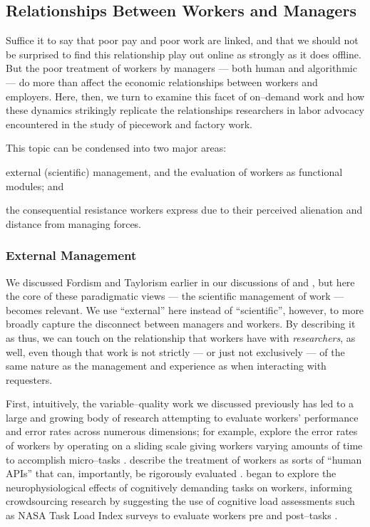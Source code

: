 \documentclass[trackingWork]{subfiles}
\begin{document}
{\subsection{Relationships Between Workers and Managers}\label{sec:relationships}
Suffice it to say that poor pay and poor work are linked,
and that we should not be surprised to find this relationship play out online as strongly as it does offline.
But the poor treatment of workers by managers
--- both human and algorithmic ---
do more than affect the economic relationships between workers and employers.
Here, then, we turn to examine this facet of on--demand work
and how these dynamics strikingly replicate the relationships
researchers in labor advocacy encountered in the study of piecework and factory work.

This topic can be condensed into two major areas:
\begin{inlinelist}
\item external (scientific) management, and the evaluation of workers as functional modules; and
\item the consequential resistance workers express due to their perceived alienation and distance from managing forces.
\end{inlinelist}

\subsubsection{External Management}
We discussed Fordism and Taylorism earlier in our discussions of
 and ,
but here the core of these paradigmatic views
--- the scientific management of work ---
becomes relevant.
We use ``external'' here instead of ``scientific'', however,
to more broadly capture the disconnect between managers and workers.
By describing it as thus,
we can touch on the relationship that workers have with \textit{researchers}, as well,
even though that work is not strictly
--- or just not exclusively ---
of the same nature as the management and experience as when interacting with requesters.

First, intuitively, the variable--quality work we discussed previously has led to
a large and growing body of research attempting to evaluate workers' performance and error rates
across numerous dimensions;
for example, \citeauthor{measuringCrowdsourcingCheng} explore the error rates of workers by
operating on a sliding scale giving workers varying amounts of time to accomplish micro--tasks
\cite{measuringCrowdsourcingCheng}.
\citeauthor{storiesIraniSilberman} describe the treatment of workers
as sorts of ``human APIs'' that can, importantly, be rigorously evaluated
\cite{storiesIraniSilberman}.
\citeauthor{gevins2003neurophysiological} began to explore the neurophysiological effects of
cognitively demanding tasks on workers,
informing crowdsourcing research by suggesting the use of cognitive load assessments such as
NASA Task Load Index surveys to evaluate workers pre and post--tasks
\cite{embracingErrorKrishna,measuringCrowdsourcingCheng}.


}
\end{document}
